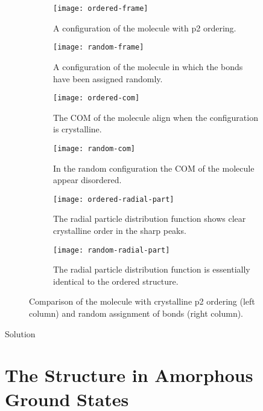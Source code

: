 \begin{figure}
    \begin{subfigure}[t]{0.5\linewidth}
        \texttt{[image: ordered-frame]}
        \caption{A configuration of the \dcon molecule with p2 ordering.}
        \label{fig:ordered frame}
    \end{subfigure}
    \begin{subfigure}[t]{0.5\linewidth}
        \texttt{[image: random-frame]}
        \caption{A configuration of the \dcon molecule in which the bonds have been assigned randomly.}
        \label{fig:random frame}
    \end{subfigure}
    \begin{subfigure}[t]{0.5\linewidth}
        \texttt{[image: ordered-com]}
        \caption{The COM of the \dcon molecule align when the configuration is crystalline.}
        \label{fig:ordered com}
    \end{subfigure}
    \begin{subfigure}[t]{0.5\linewidth}
        \texttt{[image: random-com]}
        \caption{In the random configuration the COM of the \dcon molecule appear disordered.}
        \label{fig:random com}
    \end{subfigure}
    \begin{subfigure}[t]{0.5\linewidth}
        \texttt{[image: ordered-radial-part]}
        \caption{The radial particle distribution function shows clear crystalline order in the sharp peaks.}
        \label{fig:ordered radial part}
    \end{subfigure}
    \begin{subfigure}[t]{0.5\linewidth}
        \texttt{[image: random-radial-part]}
        \caption{The radial particle distribution function is essentially identical to the ordered structure.}
        \label{fig:random radial part}
    \end{subfigure}
    \caption{Comparison of the \dcon molecule with crystalline p2 ordering (left column) and random assignment of bonds (right column).}
    \label{fig:compact bonds}
\end{figure}

Solution



\section{The Structure in Amorphous Ground States}


